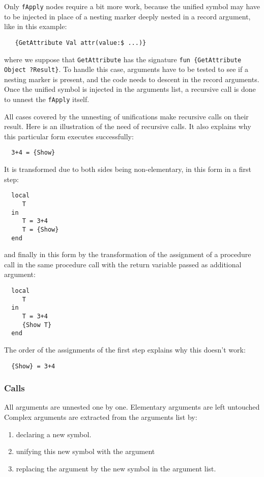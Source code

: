 \documentclass[a4paper]{memoir}
\begin{document}
Only \lstinline!fApply! nodes require a bit more work, because the unified
symbol may have to be injected in place of a nesting marker deeply nested in
a record argument, like in this example:

\begin{lstlisting}
   {GetAttribute Val attr(value:$ ...)}
\end{lstlisting}

where we suppose that \lstinline!GetAttribute! has the signature 
\lstinline!fun {GetAttribute Object ?Result}!.
To handle this case, arguments have to be tested to see if a nesting marker is
present, and the code needs to descent in the record arguments.
Once the unified symbol is injected in the arguments list, a recursive call is
done to unnest the \lstinline!fApply! itself.

All cases covered by the unnesting of unifications make recursive calls on their
result.
Here is an illustration of the need of recursive calls. It also explains why
this particular form executes successfully:
\begin{lstlisting}
  3+4 = {Show}
\end{lstlisting}
It is transformed due to both sides being non-elementary, in this form in a first step:
\begin{lstlisting}
  local
     T
  in
     T = 3+4
     T = {Show}
  end
\end{lstlisting}
and finally in this form by the transformation of the assignment of a procedure call in the same procedure call with the return variable passed as additional argument:
\begin{lstlisting}
  local
     T
  in
     T = 3+4
     {Show T}
  end
\end{lstlisting}
The order of the assignments of the first step explains why this doesn't work:
\begin{lstlisting}
  {Show} = 3+4
\end{lstlisting}

\subsubsection{Calls}\label{sec:arch:unnester:calls}
All arguments are unnested one by one. Elementary arguments are left untouched
Complex arguments are extracted from the arguments list by:
\begin{enumerate}
  \item declaring a new symbol. 
  \item unifying this new symbol with the argument
  \item replacing the argument by the new symbol in the argument list.
\end{enumerate}
\end{document}
